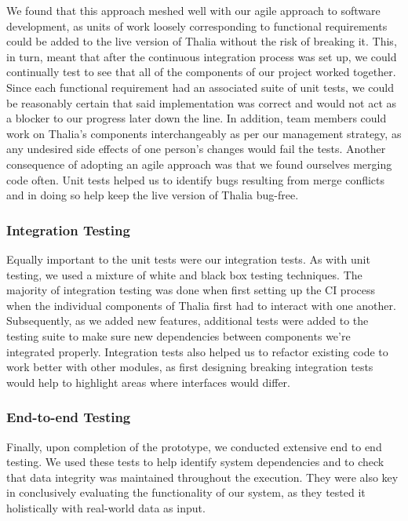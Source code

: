 \documentclass[main.tex]{subfiles}
\begin{document}
We found that this approach meshed well with our agile approach to software development, as units of work loosely corresponding to functional requirements could be added to the live version of Thalia without the risk of breaking it. This, in turn, meant that after the continuous integration process was set up, we could continually test to see that all of the components of our project worked together. Since each functional requirement had an associated suite of unit tests, we could be reasonably certain that said implementation was correct and would not act as a blocker to our progress later down the line. In addition, team members could work on Thalia’s components interchangeably as per our management strategy, as any undesired side effects of one person’s changes would fail the tests. Another consequence of adopting an agile approach was that we found ourselves merging code often. Unit tests helped us to identify bugs resulting from merge conflicts and in doing so help keep the live version of Thalia bug-free. 

\subsubsection{Integration Testing}
Equally important to the unit tests were our integration tests. As with unit testing, we used a mixture of white and black box testing techniques. The majority of integration testing was done when first setting up the CI process when the individual components of Thalia first had to interact with one another. Subsequently, as we added new features, additional tests were added to the testing suite to make sure new dependencies between components we’re integrated properly. Integration tests also helped us to refactor existing code to work better with other modules, as first designing breaking integration tests would help to highlight areas where interfaces would differ.

\subsubsection{End-to-end Testing}
Finally, upon completion of the prototype, we conducted extensive end to end testing. We used these tests to help identify system dependencies and to check that data integrity was maintained throughout the execution. They were also key in conclusively evaluating the functionality of our system, as they tested it holistically with real-world data as input.
\end{document}
